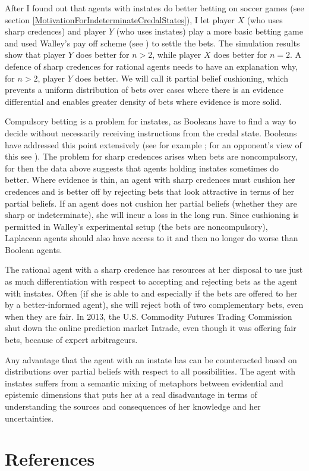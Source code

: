 \documentclass[11pt]{article}
\begin{document}
After I found out that agents with instates do better betting on
soccer games (see section
\ref{MotivationForIndeterminateCredalStates}), I let player $X$ (who
uses sharp credences) and player $Y$ (who uses instates) play a more
basic betting game and used Walley's pay off scheme (see
) to settle the bets. The simulation results
show that player $Y$ does better for $n>2$, while player $X$ does
better for $n=2$. A defence of sharp credences for rational agents
needs to have an explanation why, for $n>2$, player $Y$ does better.
We will call it partial belief cushioning, which prevents a uniform
distribution of bets over cases where there is an evidence
differential and enables greater density of bets where evidence is
more solid.

Compulsory betting is a problem for instates, as Booleans have to find
a way to decide without necessarily receiving instructions from the
credal state. Booleans have addressed this point extensively (see for
example ; for an opponent's view of this see
). The problem for sharp credences arises when
bets are noncompulsory, for then the data above suggests that agents
holding instates sometimes do better. Where evidence is thin, an agent
with sharp credences must cushion her credences and is better off by
rejecting bets that look attractive in terms of her partial beliefs.
If an agent does not cushion her partial beliefs (whether they are
sharp or indeterminate), she will incur a loss in the long run. Since
cushioning is permitted in Walley's experimental setup (the bets are
noncompulsory), Laplacean agents should also have access to it and
then no longer do worse than Boolean agents.

The rational agent with a sharp credence has resources at her disposal
to use just as much differentiation with respect to accepting and
rejecting bets as the agent with instates. Often (if she is able to
and especially if the bets are offered to her by a better-informed
agent), she will reject both of two complementary bets, even when they
are fair. In 2013, the U.S. Commodity Futures Trading Commission shut
down the online prediction market Intrade, even though it was offering
fair bets, because of expert arbitrageurs.

Any advantage that the agent with an instate has can be counteracted
based on distributions over partial beliefs with respect to all
possibilities. The agent with instates suffers from a semantic mixing
of metaphors between evidential and epistemic dimensions that puts her
at a real disadvantage in terms of understanding the sources and
consequences of her knowledge and her uncertainties.


\section{References}
\label{References}

\nocite{boole54} 

\nocite{fraassen81} 

 


\end{document}
